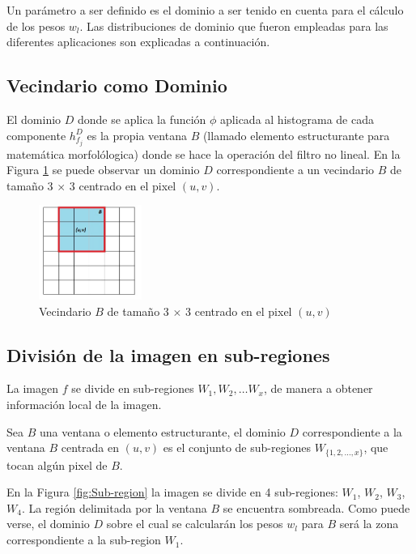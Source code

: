 Un par\'ametro a ser definido es el dominio a ser tenido en cuenta para el c\'alculo
de los pesos $w_l$. Las distribuciones de dominio que fueron empleadas para las diferentes aplicaciones son explicadas a continuaci\'on.

\subsection{Vecindario como Dominio}


El dominio $D$ donde se aplica la funci\'on $\phi$ aplicada al histograma de cada componente $h_{f_j}^D$ es la propia ventana $B$ (llamado elemento estructurante para matem\'atica morfol\'ologica) donde se hace la operaci\'on del filtro no lineal. En la Figura \ref{fig:Ventana B} se puede observar un dominio $D$ correspondiente a un vecindario $B$ de tama\~no 3 $\times$ 3 centrado en el pixel $(u,v)$.

\begin{figure}
	\centering
		\includegraphics[width=0.3\textwidth]{fig/VentanaB.jpg}
	\caption{Vecindario $B$ de tama\~no 3 $\times$ 3 centrado en el pixel $(u,v)$ }
	\label{fig:Ventana B}
\end{figure}

\subsection{Divisi\'on de la imagen en sub-regiones}

La imagen $f$ se divide en sub-regiones $W_1,W_2,\dots W_{x}$, de manera a obtener informaci\'on local de  la imagen. 

Sea $B$ una ventana o  elemento estructurante, el dominio $D$ correspondiente a la ventana $B$ centrada en $(u,v)$ es el conjunto de sub-regiones $W_{\{1,2,...,x\}}$, que tocan alg\'un pixel de $B$.

En la Figura \ref{fig:Sub-region} la imagen se divide en 4 sub-regiones: $W_1$, $W_2$, $W_3$, $W_4$.  La regi\'on delimitada por la ventana $B$ se encuentra sombreada. Como puede verse, el dominio
$D$ sobre el cual se calcular\'an los pesos $w_l$ para $B$ ser\'a la zona correspondiente a la
sub-region $W_1$.

